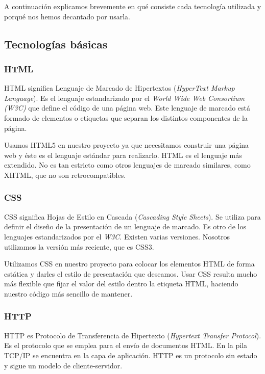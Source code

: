 A continuación explicamos brevemente en qué consiste cada tecnología utilizada y porqué nos hemos decantado por usarla. \par 

\subsection{Tecnologías básicas}

\subsubsection{HTML}
HTML significa Lenguaje de Marcado de Hipertextos (\textit{HyperText Markup Language}). Es el lenguaje estandarizado por el \textit{World Wide Web Consortium (W3C)} que define el código de una página web. Este lenguaje de marcado está formado de elementos o etiquetas que separan los distintos componentes de la página. \par

Usamos HTML5 en nuestro proyecto ya que necesitamos construir una página web y éste es el lenguaje estándar para realizarlo. HTML es el lenguaje más extendido. No es tan estricto como otros lenguajes de marcado similares, como XHTML, que no son retrocompatibles. \par

\subsubsection{CSS}
CSS significa Hojas de Estilo en Cascada (\textit{Cascading Style Sheets}). Se utiliza para definir el diseño de la presentación de un lenguaje de marcado. Es otro de los lenguajes estandarizados por el \textit{W3C}. Existen varias versiones. Nosotros utilizamos la versión más reciente, que es CSS3. \par 

Utilizamos CSS en nuestro proyecto para colocar los elementos HTML de forma estática y darles el estilo de presentación que deseamos. Usar CSS resulta mucho más flexible que fijar el valor del estilo dentro la etiqueta HTML, haciendo nuestro código más sencillo de mantener. \par

\subsubsection{HTTP}
HTTP es Protocolo de Transferencia de Hipertexto (\textit{Hypertext Transfer Protocol}). Es el protocolo que se emplea para el envío de documentos HTML. En la pila TCP/IP se encuentra en la capa de aplicación. HTTP es un protocolo sin estado y sigue un modelo de cliente-servidor.  \par

